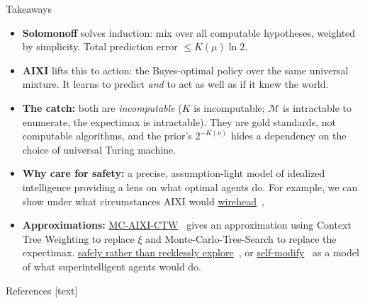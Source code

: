 \documentclass[10pt,aspectratio=169]{beamer}
\newcommand{\cM}{\mathcal{M}}
\begin{document}
\begin{frame}{Takeaways}
\begin{itemize}
    \item \textbf{Solomonoff} solves induction: mix over all computable hypotheses, weighted by simplicity.
    Total prediction error $\leq K(\mu)\ln 2$.
    \pause
    \item \textbf{AIXI} lifts this to action: the Bayes-optimal policy over the same universal mixture.
    It learns to predict \emph{and} to act as well as if it knew the world.
    \pause
    \item \textbf{The catch:} both are \emph{incomputable} ($K$ is incomputable; $\cM$ is intractable to enumerate, the expectimax is intractable).
    They are gold standards, not computable algorithms, and the prior's $2^{-K(\nu)}$ hides a dependency
    on the choice of universal Turing machine.
    \pause
    \item \textbf{Why care for safety:} a precise, assumption-light model of idealized 
    intelligence providing a lens on what optimal agents do. For example, we
    can show under what circumstances AIXI would \href{https://people.idsia.ch/~ring/AGI-2011/Paper-B.pdf}{wirehead}~,
    \item \textbf{Approximations:} \href{https://arxiv.org/abs/0909.0801}{MC-AIXI-CTW}~ gives an approximation using Context Tree Weighting to
    replace $\xi$ and Monte-Carlo-Tree-Search to replace the expectimax. 
    \href{https://arxiv.org/pdf/2006.03357}{safely rather than recklessly explore}~, or
    \href{https://link.springer.com/chapter/10.1007/978-3-642-22887-2_1}{self-modify}~
    as a model of what superintelligent agents would do.
\end{itemize}
\end{frame}

\begin{frame}[allowframebreaks]{References}
\footnotesize
{}[text]


\end{frame}
\end{document}
